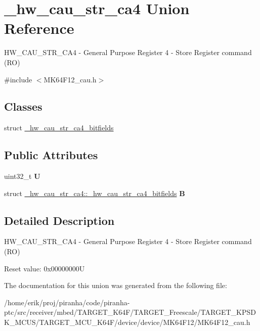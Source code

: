 \hypertarget{union__hw__cau__str__ca4}{}\section{\+\_\+hw\+\_\+cau\+\_\+str\+\_\+ca4 Union Reference}
\label{union__hw__cau__str__ca4}


H\+W\+\_\+\+C\+A\+U\+\_\+\+S\+T\+R\+\_\+\+C\+A4 -\/ General Purpose Register 4 -\/ Store Register command (RO)  




{\ttfamily \#include $<$M\+K64\+F12\+\_\+cau.\+h$>$}

\subsection*{Classes}
\begin{DoxyCompactItemize}
\item 
struct \hyperlink{struct__hw__cau__str__ca4_1_1__hw__cau__str__ca4__bitfields}{\+\_\+hw\+\_\+cau\+\_\+str\+\_\+ca4\+\_\+bitfields}
\end{DoxyCompactItemize}
\subsection*{Public Attributes}
\begin{DoxyCompactItemize}
\item 
uint32\+\_\+t {\bfseries U}\hypertarget{union__hw__cau__str__ca4_a56e031bc9e4868e5045dfb942acbc197}{}\label{union__hw__cau__str__ca4_a56e031bc9e4868e5045dfb942acbc197}

\item 
struct \hyperlink{struct__hw__cau__str__ca4_1_1__hw__cau__str__ca4__bitfields}{\+\_\+hw\+\_\+cau\+\_\+str\+\_\+ca4\+::\+\_\+hw\+\_\+cau\+\_\+str\+\_\+ca4\+\_\+bitfields} {\bfseries B}\hypertarget{union__hw__cau__str__ca4_ad0c7e637a1eded1c5a49c156f9208c3f}{}\label{union__hw__cau__str__ca4_ad0c7e637a1eded1c5a49c156f9208c3f}

\end{DoxyCompactItemize}


\subsection{Detailed Description}
H\+W\+\_\+\+C\+A\+U\+\_\+\+S\+T\+R\+\_\+\+C\+A4 -\/ General Purpose Register 4 -\/ Store Register command (RO) 

Reset value\+: 0x00000000U 

The documentation for this union was generated from the following file\+:\begin{DoxyCompactItemize}
\item 
/home/erik/proj/piranha/code/piranha-\/ptc/src/receiver/mbed/\+T\+A\+R\+G\+E\+T\+\_\+\+K64\+F/\+T\+A\+R\+G\+E\+T\+\_\+\+Freescale/\+T\+A\+R\+G\+E\+T\+\_\+\+K\+P\+S\+D\+K\+\_\+\+M\+C\+U\+S/\+T\+A\+R\+G\+E\+T\+\_\+\+M\+C\+U\+\_\+\+K64\+F/device/device/\+M\+K64\+F12/M\+K64\+F12\+\_\+cau.\+h\end{DoxyCompactItemize}
